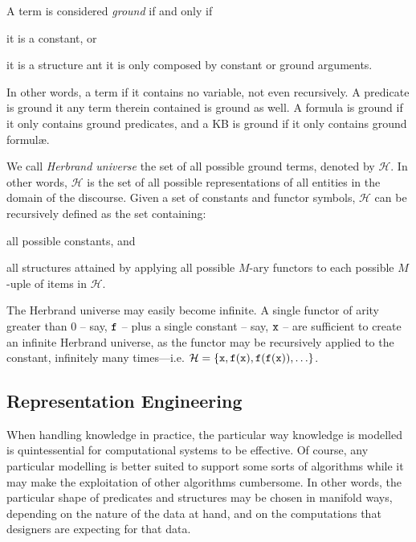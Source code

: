 \documentclass[12pt,a4paper,openright,twoside]{book}
\begin{document}
A term is considered \emph{ground} if and only if
%
\begin{inlinelist}
    \item it is a constant, or
    \item it is a structure ant it is only composed by constant or ground arguments.
\end{inlinelist}
%
In other words, a term if it contains no variable, not even recursively.
%
A predicate is ground it any term therein contained is ground as well.
%
A formula is ground if it only contains ground predicates, and a KB is ground if it only contains ground formul\ae{}.

We call \emph{Herbrand universe} the set of all possible ground terms, denoted by $\mathcal{H}$.
%
In other words, $\mathcal{H}$ is the set of all possible representations of all entities in the domain of the discourse.
%
Given a set of constants and functor symbols, $\mathcal{H}$ can be recursively defined as the set containing:
%
\begin{inlinelist}
    \item all possible constants, and
    \item all structures attained by applying all possible $M$-ary functors to each possible $M$-uple of items in $\mathcal{H}$.
\end{inlinelist}

The Herbrand universe may easily become infinite.
%
A single functor of arity greater than 0 -- say, $\mathtt{f}$ -- plus a single constant -- say, $\mathtt{x}$ -- are sufficient to create an infinite Herbrand universe, as the functor may be recursively applied to the constant, infinitely many times---i.e. $\mathcal{H} = \{ \mathtt{x}, \mathtt{f}(\mathtt{x}), \mathtt{f}(\mathtt{f}(\mathtt{x})), \ldots \}$.

\subsection{Representation Engineering}

When handling knowledge in practice, the particular way knowledge is modelled is quintessential for computational systems to be effective.
%
Of course, any particular modelling is better suited to support some sorts of algorithms while it may make the exploitation of other algorithms cumbersome.
%
In other words, the particular shape of predicates and structures may be chosen in manifold ways, depending on the nature of the data at hand, and on the computations that designers are expecting for that data.
\end{document}
